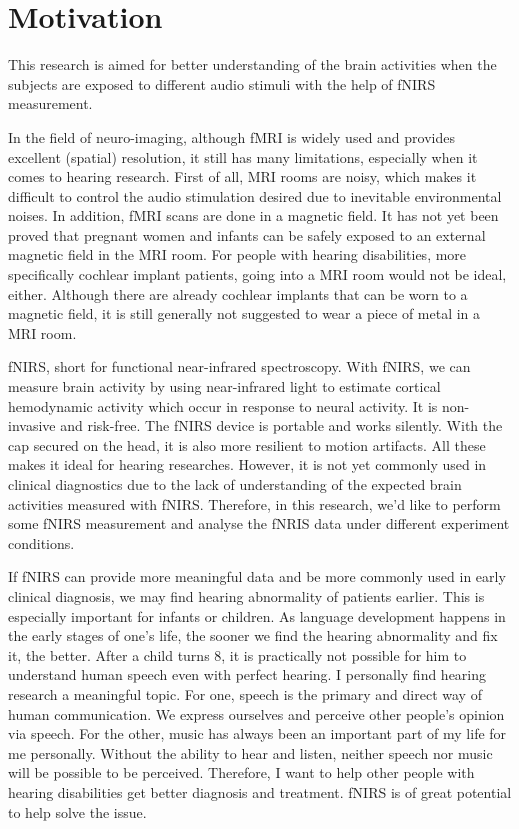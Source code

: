 \chapter{Motivation}
This research is aimed for better understanding of the brain activities when the subjects are exposed to different audio stimuli with the help of fNIRS measurement.

In the field of neuro-imaging, although fMRI is widely used and provides excellent (spatial) resolution, it still has many limitations, especially when it comes to hearing research. First of all, MRI rooms are noisy, which makes it difficult to control the audio stimulation desired due to inevitable environmental noises. In addition, fMRI scans are done in a magnetic field. It has not yet been proved that pregnant women and infants can be safely exposed to an external magnetic field in the MRI room. For people with hearing disabilities, more specifically cochlear implant patients, going into a MRI room would not be ideal, either. Although there are already cochlear implants that can be worn to a magnetic field, it is still generally not suggested to wear a piece of metal in a MRI room.

fNIRS,  short for functional near-infrared spectroscopy. With fNIRS, we can measure brain activity by using near-infrared light to estimate cortical hemodynamic activity which occur in response to neural activity. It is non-invasive and risk-free. The fNIRS device is portable and works silently. With the cap secured on the head, it is also more resilient to motion artifacts. All these makes it ideal for hearing researches. However, it is not yet commonly used in clinical diagnostics due to the lack of understanding of the expected brain activities measured with fNIRS. Therefore, in this research, we'd like to perform some fNIRS measurement and analyse the fNRIS data under different experiment conditions.

If fNIRS can provide more meaningful data and be more commonly used in early clinical diagnosis, we may find hearing abnormality of patients earlier. This is especially important for infants or children. As language development happens in the early stages of one's life, the sooner we find the hearing abnormality and fix it, the better. After a child turns 8, it is practically not possible for him to understand human speech even with perfect hearing. I personally find hearing research a meaningful topic. For one, speech is the primary and direct way of human communication. We express ourselves and perceive other people's opinion via speech. For the other, music has always been an important part of my life for me personally. Without the ability to hear and listen, neither speech nor music will be possible to be perceived. Therefore, I want to help other people with hearing disabilities get better diagnosis and treatment. fNIRS is of great potential to help solve the issue.














